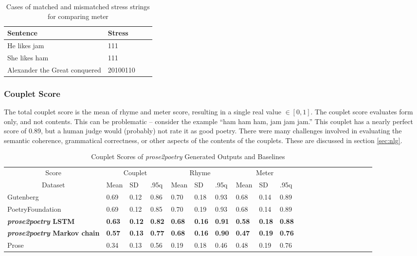 \documentclass[11pt,a4paper]{article}
\begin{document}
\begin{table}
\centering
\begin{tabular}{ll c c}
	\hline\hline
	Sentence & Stress \\ [0.5ex]
	\hline\hline
	He likes jam & 111 \\ [0.5ex]
	\hline
	She likes ham & 111 \\ [0.5ex]
	\hline
	Alexander the Great conquered & 20100110 \\ [0.5ex]
	\hline
\end{tabular}
\caption{Cases of matched and mismatched stress strings for comparing meter}
\label{table:stress}
\end{table}

\subsubsection{Couplet Score}
\label{sec:coupletscore}

The total couplet score is the mean of rhyme and meter score, resulting in a single real value $\in [0, 1]$.
 The couplet score evaluates form only, and not contents. This can be problematic -- consider the example ``ham ham ham, jam jam jam.'' This couplet has a nearly perfect score of 0.89, but a human judge would (probably) not rate it as good poetry. There were many challenges involved in evaluating the semantic coherence, grammatical correctness, or other aspects of the contents of the couplets. These are discussed in section \ref{sec:nlg}.

\begin{table}[ht]
\begin{tabular}{|l|l|l|l|l|l|l|l|l|l|l|c|c|c|c|c|c|c|c|c|c|}
\hline\hline
\multicolumn{1}{|c|}{Score} & \multicolumn{3}{c|}{Couplet} & \multicolumn{3}{c|}{Rhyme} & \multicolumn{3}{c|}{Meter}\\
\cline{1-10}
\multicolumn{1}{|c|}{Dataset} & Mean & SD & .95q & Mean & SD & .95q & Mean & SD & .95q \\
\hline\hline
Gutenberg & 0.69 & 0.12 & 0.86 & 0.70 & 0.18 & 0.93 & 0.68 & 0.14 & 0.89 \\ [0.5ex]
\hline
PoetryFoundation & 0.69 & 0.12 & 0.85 & 0.70 & 0.19 & 0.93 & 0.68 & 0.14 & 0.89 \\ [0.5ex]
\hline
\textbf{\textit{prose2poetry} LSTM} & \textbf{0.63} & \textbf{0.12} & \textbf{0.82} & \textbf{0.68} & \textbf{0.16} & \textbf{0.91} & \textbf{0.58} & \textbf{0.18} & \textbf{0.88} \\ [0.5ex]
\hline
\textbf{\textit{prose2poetry} Markov chain} & \textbf{0.57} & \textbf{0.13} & \textbf{0.77} & \textbf{0.68} & \textbf{0.16} & \textbf{0.90} & \textbf{0.47} & \textbf{0.19} & \textbf{0.76} \\ [0.5ex]
\hline
Prose & 0.34 & 0.13 & 0.56 & 0.19 & 0.18 & 0.46 & 0.48 & 0.19 & 0.76 \\ [0.5ex]
\hline
\end{tabular}

\caption{Couplet Scores of \textit{prose2poetry} Generated Outputs and Baselines}
\label{table:couplet_results}
\end{table}
\end{document}
